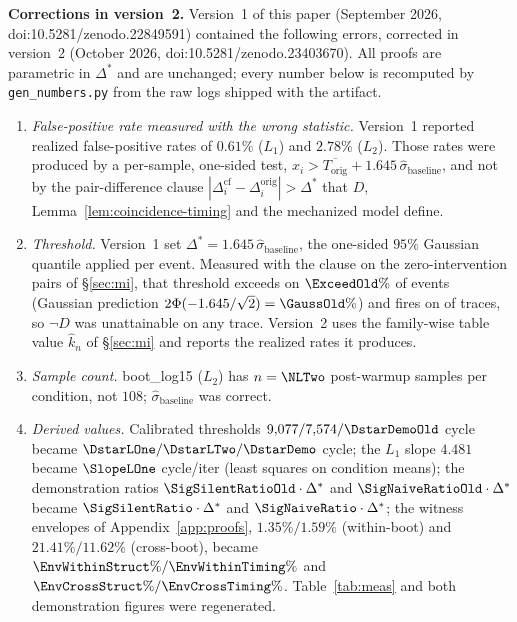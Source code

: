 \documentclass[conference]{IEEEtran}
\newcommand{\sigbase}{\hat{\sigma}_\text{baseline}}
\newcommand{\Dstar}{\Delta^{*}}
\begin{document}
\noindent\textbf{Corrections in version~2.} Version~1 of this paper
(September 2026, doi:10.5281/zenodo.22849591) contained the following
errors, corrected in version~2 (October 2026,
doi:10.5281/zenodo.23403670). All proofs are parametric in $\Dstar$
and are unchanged; every number below is recomputed by
\texttt{gen\_numbers.py} from the raw logs shipped with the artifact.
\begin{enumerate}
\item \emph{False-positive rate measured with the wrong statistic.}
  Version~1 reported realized false-positive rates of $0.61\%$ ($L_1$)
  and $2.78\%$ ($L_2$). Those rates were produced by a per-sample,
  one-sided test, $x_i > \overline{T_\text{orig}} + 1.645\,\sigbase$,
  and not by the pair-difference clause $|\Delta^{\text{cf}}_i -
  \Delta^{\text{orig}}_i| > \Dstar$ that $D$,
  Lemma~\ref{lem:coincidence-timing} and the mechanized model define.
\item \emph{Threshold.} Version~1 set $\Dstar = 1.645\,\sigbase$, the
  one-sided $95\%$ Gaussian quantile applied per event. Measured with
  the clause on the \NullBoots{} zero-intervention pairs of
  \S\ref{sec:mi}, that threshold exceeds on $\ExceedOld\%$ of events
  (Gaussian prediction $2\Phi(-1.645/\sqrt2) = \GaussOld\%$) and fires
  on \FamFireOld{} of \NullBoots{} traces, so $\neg D$ was unattainable
  on any trace. Version~2 uses the family-wise table value $\hat{k}_n$
  of \S\ref{sec:mi} and reports the realized rates it produces.
\item \emph{Sample count.} boot\_log15 ($L_2$) has $n = \NLTwo$
  post-warmup samples per condition, not $108$; $\sigbase$ was correct.
\item \emph{Derived values.} Calibrated thresholds $9{,}077 / 7{,}574 /
  \DstarDemoOld$ cycle became $\DstarLOne / \DstarLTwo / \DstarDemo$ cycle;
  the $L_1$ slope $4.481$ became $\SlopeLOne$ cycle/iter (least squares
  on condition means); the demonstration ratios $\SigSilentRatioOld\cdot\Dstar$ and
  $\SigNaiveRatioOld\cdot\Dstar$ became $\SigSilentRatio\cdot\Dstar$ and
  $\SigNaiveRatio\cdot\Dstar$; the witness envelopes of
  Appendix~\ref{app:proofs}, $1.35\%/1.59\%$ (within-boot) and
  $21.41\%/11.62\%$ (cross-boot), became
  $\EnvWithinStruct\%/\EnvWithinTiming\%$ and
  $\EnvCrossStruct\%/\EnvCrossTiming\%$. Table~\ref{tab:meas} and both
  demonstration figures were regenerated.
\end{enumerate}
\fi
\end{document}

